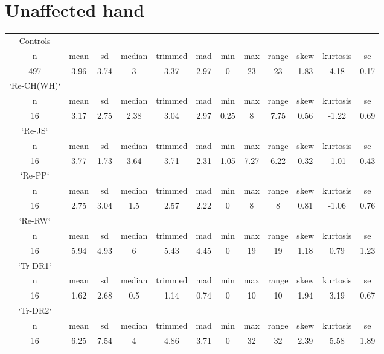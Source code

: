 \documentclass{article}
\begin{document}
\section{Unaffected hand}
\begin{tabular}{c c c c c c c c c c c c }
Controls&&&&&&&&&&&\\
     n &mean   &sd& median &trimmed & mad &min &max &range &skew &kurtosis &  se\\
     497 &3.96& 3.74  &    3  & 3.37 &2.97   &0 & 23  &  23 &1.83&     4.18& 0.17\\

`Re-CH(WH)`&&&&&&&&&&&\\
 n &mean   &sd& median &trimmed & mad &min &max &range &skew &kurtosis &  se\\
    16 &3.17& 2.75 &  2.38 &   3.04& 2.97 &0.25   &8 & 7.75& 0.56&    -1.22 &0.69\\

`Re-JS`&&&&&&&&&&&\\
  n &mean   &sd& median &trimmed & mad &min &max &range &skew &kurtosis &  se\\
     16& 3.77& 1.73  & 3.64 &   3.71 &2.31& 1.05 &7.27&  6.22 &0.32 &   -1.01& 0.43\\

`Re-PP`&&&&&&&&&&&\\
   n &mean   &sd& median &trimmed & mad &min &max &range &skew &kurtosis &  se\\
     16& 2.75 &3.04 &   1.5 &   2.57& 2.22 &  0 &  8 &    8& 0.81 &   -1.06 &0.76\\

`Re-RW`&&&&&&&&&&&\\
   n &mean   &sd& median &trimmed & mad &min &max &range &skew &kurtosis &  se\\
     16 &5.94 &4.93   &   6   & 5.43 &4.45 &  0 & 19  &  19 &1.18   &  0.79& 1.23\\

`Tr-DR1`&&&&&&&&&&&\\
   n &mean   &sd& median &trimmed & mad &min &max &range &skew &kurtosis &  se\\
     16& 1.62 &2.68  &  0.5   & 1.14 &0.74 &  0  &10  &  10 &1.94  &   3.19& 0.67\\

`Tr-DR2`&&&&&&&&&&&\\
   n &mean   &sd& median &trimmed & mad &min &max &range &skew &kurtosis &  se\\
    16 &6.25 &7.54 &     4   & 4.86 &3.71 &  0  &32 &   32& 2.39 &    5.58 &1.89\\


\end{tabular}
\end{document}
